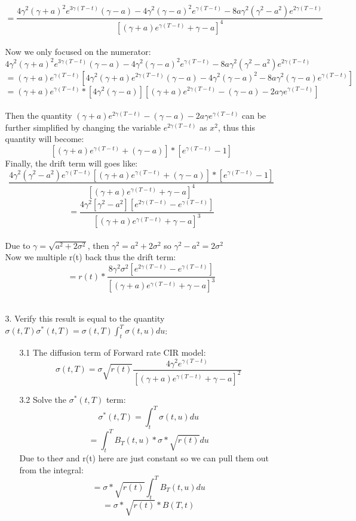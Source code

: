 \documentclass[14pt]{extarticle}
\begin{document}
\begin{itemize}
\begin{itemize}
    $$= \frac{4\gamma^2(\gamma+a)^2e^{3\gamma(T-t)}(\gamma-a)-4\gamma^2(\gamma-a)^2e^{\gamma(T-t)} -8a\gamma^2(\gamma^2-a^2)e^{2\gamma(T-t)} } {  [(\gamma+a)e^{\gamma(T-t)}+\gamma-a ]^4 } $$
    ~\\
    Now we only focused on the numerator: 
    $$ 4\gamma^2(\gamma+a)^2e^{3\gamma(T-t)}(\gamma-a)-4\gamma^2(\gamma-a)^2e^{\gamma(T-t)} -8a\gamma^2(\gamma^2-a^2)e^{2\gamma(T-t)}$$
    $$=(\gamma+a)e^{\gamma(T-t)} [4\gamma^2(\gamma+a)e^{2\gamma(T-t)} (\gamma-a)-4\gamma^2(\gamma-a)^2-8a\gamma^2(\gamma-a)e^{\gamma(T-t)}]$$
    $$=  (\gamma+a)e^{\gamma(T-t)}* [4\gamma^2(\gamma-a)] [(\gamma+a)e^{2\gamma(T-t)}-(\gamma-a)-2a\gamma e^{\gamma(T-t)}    ]$$
    ~\\
    Then the quantity 
    $ (\gamma+a)e^{2\gamma(T-t)}-(\gamma-a)-2a\gamma e^{\gamma(T-t)}$ can be further simplified by changing the variable $e^{2\gamma(T-t)} $ as $x^2$, thus this quantity will become:
    $$ [(\gamma+a) e^{\gamma(T-t)} +(\gamma-a)]*[e^{\gamma(T-t)}-1]$$
    Finally, the drift term will goes like:
    $$\frac{4\gamma^2(\gamma^2-a^2)e^{\gamma(T-t)} [(\gamma+a) e^{\gamma(T-t)} +(\gamma-a)]*[e^{\gamma(T-t)}-1]}{[(\gamma+a)e^{\gamma(T-t)}+\gamma-a ]^4}     $$
    $$= \frac{4\gamma^2[\gamma^2-a^2] [e^{2\gamma(T-t)}-e^{\gamma(T-t)}]}{[(\gamma+a)e^{\gamma(T-t)}+\gamma-a ]^3}$$
    ~\\
    Due to $\gamma=\sqrt{a^2+2\sigma^2}$, then $\gamma^2=a^2+2\sigma^2$ so $\gamma^2-a^2=2\sigma^2$
    ~\\
    Now we multiple r(t) back thus the drift term:
    $$=r(t)*\frac{8\gamma^2\sigma^2[e^{2\gamma(T-t)}-e^{\gamma(T-t)}]     }         {[(\gamma+a)e^{\gamma(T-t)}+\gamma-a ]^3}$$
    ~\\
    \item[3.]Verify this result is equal to the quantity $\sigma(t,T)\sigma^*(t,T) =\sigma(t,T)\int_t^T \sigma(t,u) du$:
    \begin{itemize}
        \item [3.1]The diffusion term of Forward rate CIR model:
        $$\sigma(t,T)=\sigma \sqrt{r(t)}\frac{4\gamma^2e^{\gamma(T-t)}}{[(\gamma+a)e^{\gamma(T-t)}+\gamma-a ]^2} $$
        
        \item [3.2] Solve the $\sigma^*(t,T)$ term:
        $$\sigma^*(t,T)= \int_t^T \sigma(t,u) du  $$
        $$=\int_t^T B_T(t,u)*\sigma*\sqrt{r(t)} du        $$
        Due to the$ \sigma $ and r(t) here are just constant so we can pull them out from the integral:
        $$= \sigma*\sqrt{r(t)} \int_t^T B_T(t,u) du $$
        $$= \sigma*\sqrt{r(t)} *B(T,t)$$
        ~\\
        

\end{itemize}
\end{itemize}
\end{itemize}
\end{document}
